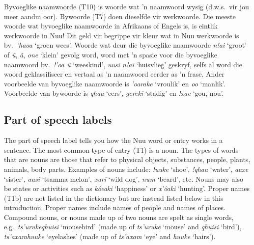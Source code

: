 Byvoeglike naamwoorde (T10) is woorde wat 'n naamwoord wysig (d.w.s.\
vir jou meer aandui oor). Bywoorde (T7) doen dieselfde vir werkwoorde.
Die meeste woorde wat byvoeglike naamwoorde in Afrikaans of Engels is,
is eintlik werkwoorde in N\textipa{\textvertline}uu! Dit geld vir
begrippe vir kleur wat in N\textipa{\textvertline}uu werkwoorde is
bv.\ \emph{\textipa{\textdoublevertline}'haoa} `groen wees'. Woorde
wat deur die byvoeglike naamwoorde \emph{n!ai} `groot' of
\emph{\^{u}}, \emph{\textipa{\!o}\^{a}},
\emph{one} `klein' gevolg word, word met 'n spasie voor
die byvoeglike naamwoord bv.\ \emph{!'oa \textipa{\!o}\^{u}}
`weeskind', \emph{\textipa{\textdoublebarpipe}uusi n!ai} `huisvlieg'
geskryf, selfs al word die woord geklassifiseer en vertaal as 'n
naamwoord eerder as 'n frase. Ander voorbeelde van byvoeglike
naamwoorde is \emph{\textipa{\textdoublevertline}'oarake} `vroulik' en
\emph{\textipa{\textdoublebarpipe}oo} `manlik'. Voorbeelde van
bywoorde is \emph{\textipa{\textdoublevertline}qhaa} `eers',
\emph{gereki} `stadig' en \emph{!xae} `gou, nou'.\\


\markboth{}{}
\addtocounter{subsection}{-1}
\tocless\subsection{Part of speech labels}
\addcontentsline{toc}{subsection}{\numberline {\thesubsection}Part of
speech labels}
\label{s:pos_e}
\markboth{}{}

The part of speech label tells you how the N\textipa{\textvertline}uu
word or entry works in a sentence. The most common type of entry (T1)
is a noun. The types of words that are nouns are those that refer to
physical objects, substances, people, plants, animals, body parts.
Examples of nouns include: \emph{!uuke} `shoe', \emph{!qhaa} `water',
\emph{\textipa{\textdoublevertline}aaxe} `sister',
\emph{\textipa{\textdoublebarpipe}ausi} `tsamma melon',
\emph{\textipa{\textdoublevertline}xuri} `wild dog',
\emph{n\textipa{\textvertline}um} `beard', etc. Nouns may also be
states or activities such as \emph{k\^{o}eaki} `happiness' or
\emph{\textipa{\textvertline}x'\^{o}aki} `hunting'. Proper names (T1b)
are not listed in the dictionary but are instead listed below in this
introduction. Proper names include names of people and names of
places. Compound nouns, or nouns made up of two nouns are spelt as
single words, e.g.\ \emph{ts'uruke\textipa{\textvertline}qhuisi}
`mousebird' (made up of \emph{ts'uruke} `mouse' and
\emph{\textipa{\textvertline}qhuisi} `bird'),
\emph{ts'axam\textipa{\textvertline}huuke} `eyelashes' (made up of
\emph{ts'axam} `eye' and \emph{\textipa{\textvertline}huuke}
`hairs').\\

